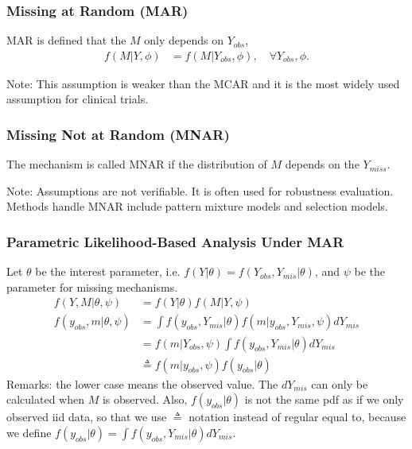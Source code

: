 \documentclass[notes=no]{beamer}
\begin{document}
\begin{frame}
	\frametitle{Missing at Random (MAR)}
	\begin{definition}[MAR]
	MAR is defined that the $M$ only depends on $Y_{obs}$,
	\begin{align*}
	f(M | Y, \phi) &= f(M|Y_{obs}, \phi), \quad \forall Y_{obs}, \phi.
	\end{align*}
	\end{definition}
	Note: This assumption is weaker than the MCAR and it is the most widely used assumption for clinical trials.
\end{frame}

\begin{frame}
	\frametitle{Missing Not at Random (MNAR)}
	\begin{definition}[MNAR]
	The mechanism is called MNAR if the distribution of $M$ depends on the $Y_{miss}$.	
	\end{definition}
Note: Assumptions are not verifiable. It is often used for robustness evaluation. Methods handle MNAR include pattern mixture models and selection models.	
\end{frame}

\begin{frame}
	\frametitle{Parametric Likelihood-Based Analysis Under MAR}
		Let $\theta$ be the interest parameter, i.e. $f(Y|\theta) = f(Y_{obs}, Y_{mis}|\theta)$, and $\psi$ be the parameter for missing mechanisms. 
			\begin{align*}
		f(Y,M|\theta, \psi) &= f(Y|\theta) f(M|Y,\psi)\\
		f(y_{obs},m|\theta, \psi)&= \int f(y_{obs}, Y_{mis}|\theta) f(m|y_{obs}, Y_{mis},\psi) d Y_{mis} \\
		&= f(m|Y_{obs}, \psi) \int f(y_{obs},Y_{mis}|\theta) dY_{mis}\\
		&\triangleq f(m|y_{obs}, \psi) f(y_{obs}|\theta)
		\end{align*}
Remarks: the lower case means the observed value. The $dY_{mis}$ can only be calculated when $M$ is observed. Also, $f(y_{obs}|\theta)$ is not the same pdf as if we only observed iid data, so that we use $\triangleq$ notation instead of regular equal to, because we define  $f(y_{obs}|\theta) = \int f(y_{obs},Y_{mis}|\theta) dY_{mis}$.		
\end{frame}
\end{document}
